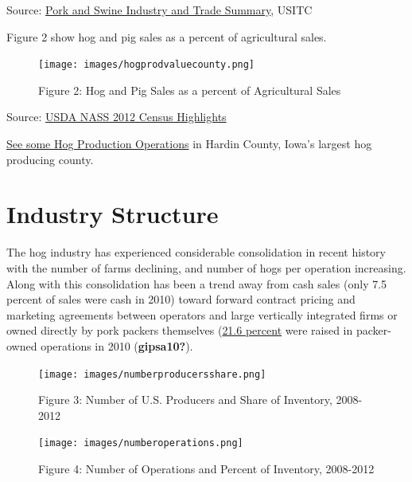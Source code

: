 \documentclass[
  letterpaper,
  DIV=11,
  numbers=noendperiod]{scrreprt}
\begin{document}
Source: \href{pdf-Readings/pork_and_swine_summary.pdf}{Pork and Swine
Industry and Trade Summary}, USITC

Figure 2 show hog and pig sales as a percent of agricultural sales.

\begin{figure}[H]

{\centering \texttt{[image: images/hogprodvaluecounty.png]}

}

\caption{Figure 2: Hog and Pig Sales as a percent of Agricultural Sales}

\end{figure}%

Source: \href{pdf-Readings/12CensusHighlightsHogs.pdf}{USDA NASS 2012
Census Highlights}

\href{https://www.google.com/maps/place/Hardin+County,+IA/@42.3833668,-93.3907209,60627m/data=!3m2!1e3!4b1!4m2!3m1!1s0x87ee2ed39f2db5df:0x67a785cf003d5369!6m1!1e1}{See
some Hog Production Operations} in Hardin County, Iowa's largest hog
producing county.

\section{Industry Structure}\label{industry-structure}

The hog industry has experienced considerable consolidation in recent
history with the number of farms declining, and number of hogs per
operation increasing. Along with this consolidation has been a trend
away from cash sales (only 7.5 percent of sales were cash in 2010)
toward forward contract pricing and marketing agreements between
operators and large vertically integrated firms or owned directly by
pork packers themselves (\href{pdf-readings/gipsa10.pdf}{21.6 percent}
were raised in packer-owned operations in 2010 (\textbf{gipsa10?}).

\begin{figure}[H]

{\centering \texttt{[image: images/numberproducersshare.png]}

}

\caption{Figure 3: Number of U.S. Producers and Share of Inventory,
2008-2012}

\end{figure}%
\begin{figure}[H]

{\centering \texttt{[image: images/numberoperations.png]}

}

\caption{Figure 4: Number of Operations and Percent of Inventory,
2008-2012}

\end{figure}%
\end{document}

